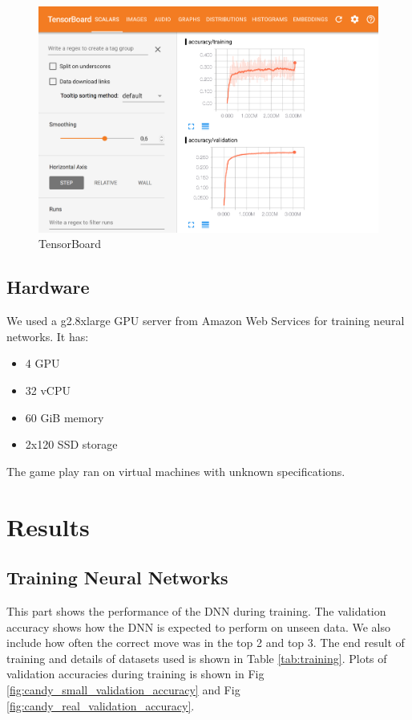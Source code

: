 \documentclass{kththesis}
\begin{document}
\begin{figure}
\centering
\includegraphics[width=\textwidth]{images/tensorboard.png}
\caption{TensorBoard}
\label{fig:tensorboard}
\end{figure}

\section{Hardware}
We used a g2.8xlarge GPU server from Amazon Web Services for training neural networks.
It has:
\begin{itemize}
\item  4 GPU
\item 32 vCPU
\item 60 GiB memory
\item  2x120 SSD storage
\end{itemize}

The game play ran on virtual machines with unknown specifications.




\chapter{Results}

\section{Training Neural Networks}
This part shows the performance of the DNN during training. The validation accuracy shows how the DNN is expected to perform on unseen data. We also include how often the correct move was in the top 2 and top 3. The end result of training and details of datasets used is shown in Table \ref{tab:training}. Plots of validation accuracies during training is shown in Fig \ref{fig:candy_small_validation_accuracy} and Fig \ref{fig:candy_real_validation_accuracy}.
\end{document}
